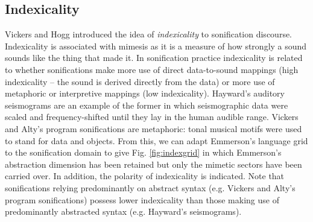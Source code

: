 \documentclass[runningheads]{llncs}
\begin{document}
\subsection{Indexicality}
Vickers and Hogg \cite{Vickers:2006a} introduced the idea of \emph{indexicality} to sonification discourse. Indexicality is associated with mimesis as it is a measure of how strongly a sound sounds like the thing that made it. In sonification practice indexicality is related to whether sonifications make more use of direct data-to-sound mappings (high indexicality -- the sound is derived directly from the data) or more use of metaphoric or interpretive mappings (low indexicality). Hayward's \cite{Hayward:1994} auditory seismograms are an example of the former in which seismographic data were scaled and frequency-shifted until they lay in the human audible range. Vickers and Alty's \cite{Vickers:2003} program sonifications are metaphoric: tonal musical motifs were used to stand for data and objects. From this, we can adapt Emmerson's language grid to the sonification domain to give Fig. \ref{fig:indexgrid} in which Emmerson's abstraction dimension has been retained but only the mimetic sectors have been carried over. In addition, the polarity of indexicality is indicated. Note that sonifications relying predominantly on abstract syntax (e.g. Vickers and Alty's program sonifications) possess lower indexicality than those making use of predominantly abstracted syntax (e.g. Hayward's seismograms).
\end{document}
